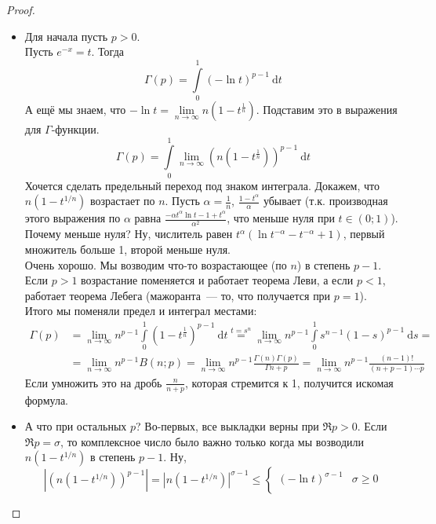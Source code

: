 \documentclass{article}
\begin{document}
    \begin{proof}
        \begin{itemize}
            \item Для начала пусть $p>0$.\\
            Пусть $e^{-x}=t$. Тогда
            $$
            \Gamma(p)=\int\limits_0^1(-\ln t)^{p-1}~\mathrm dt
            $$
            А ещё мы знаем, что $-\ln t=\lim\limits_{n\to\infty}n(1-t^{\frac1n})$. Подставим это в выражения для $\Gamma$-функции.
            $$
            \Gamma(p)=\int\limits_0^1\lim\limits_{n\to\infty}(n(1-t^{\frac1n}))^{p-1}~\mathrm dt
            $$
            Хочется сделать предельный переход под знаком интеграла. Докажем, что $n(1-t^{1/n})$ возрастает по $n$. Пусть $\alpha=\frac1n$, $\frac{1-t^{\alpha}}\alpha$ убывает (т.к. производная этого выражения по $\alpha$ равна $\frac{-\alpha t^\alpha\ln t-1+t^\alpha}{\alpha^2}$, что меньше нуля при $t\in(0;1)$). Почему меньше нуля? Ну, числитель равен $t^\alpha(\ln t^{-\alpha}-t^{-\alpha}+1)$, первый множитель больше 1, второй меньше нуля.\\
            Очень хорошо. Мы возводим что-то возрастающее (по $n$) в степень $p-1$. Если $p>1$ возрастание поменяется и работает теорема Леви, а если $p<1$, работает теорема Лебега (мажоранта~--- то, что получается при $p=1$).\\
            Итого мы поменяли предел и интеграл местами:
            \[\begin{split}
                \Gamma(p)&=\lim\limits_{n\to\infty}n^{p-1}\int\limits_0^1(1-t^{\frac1n})^{p-1}~\mathrm dt\overset{t=s^n}=\lim\limits_{n\to\infty}n^{p-1}\int\limits_0^1s^{n-1}(1-s)^{p-1}~\mathrm ds=\\
                &=\lim\limits_{n\to\infty}n^{p-1}B(n;p)=\lim\limits_{n\to\infty}n^{p-1}\frac{\Gamma(n)\Gamma(p)}{\Gamma{n+p}}=\lim\limits_{n\to\infty}n^{p-1}\frac{(n-1)!}{(n+p-1)\cdots p}
            \end{split}\]
            Если умножить это на дробь $\frac n{n+p}$, которая стремится к 1, получится искомая формула.
            \item А что при остальных $p$? Во-первых, все выкладки верны при $\Re p>0$. Если $\Re p=\sigma$, то комплексное число было важно только когда мы возводили $n(1-t^{1/n})$ в степень $p-1$. Ну,
            $$\left|\left(n(1-t^{1/n})\right)^{p-1}\right|=\left|n(1-t^{1/n})\right|^{\sigma-1}\leqslant\begin{cases}
                (-\ln t)^{\sigma-1} & \sigma\geqslant0\\

\end{cases}$$
\end{itemize}
\end{proof}
\end{document}
